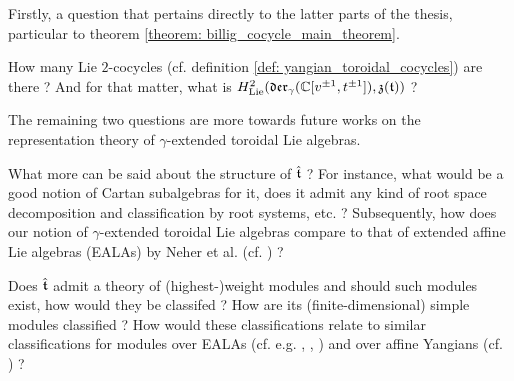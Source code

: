         Firstly, a question that pertains directly to the latter parts of the thesis, particular to theorem \ref{theorem: billig_cocycle_main_theorem}.
        \begin{question}
            How many  Lie $2$-cocycles (cf. definition \ref{def: yangian_toroidal_cocycles}) are there ? And for that matter, what is $H^2_{\mathrm{Lie}}(\mathfrak{der}_{\gamma}(\mathbb{C}[v^{\pm 1}, t^{\pm 1}]), \mathfrak{z}(\mathfrak{t}))$ ?
        \end{question}

        The remaining two questions are more towards future works on the representation theory of $\gamma$-extended toroidal Lie algebras.
        \begin{question}
            What more can be said about the structure of $\hat{\mathfrak{t}}$ ? For instance, what would be a good notion of Cartan subalgebras for it, does it admit any kind of root space decomposition and classification by root systems, etc. ? Subsequently, how does our notion of $\gamma$-extended toroidal Lie algebras compare to that of extended affine Lie algebras (EALAs) by Neher et al. (cf. \cite{neher_lectures_on_EALAs}) ?
        \end{question}
        \begin{question}
            Does $\hat{\mathfrak{t}}$ admit a theory of (highest-)weight modules and should such modules exist, how would they be classifed ? How are its (finite-dimensional) simple modules classified ? How would these classifications relate to similar classifications for modules over EALAs (cf. e.g. \cite{billig_representations_of_toroidal_extended_affine_lie_algebras}, \cite{billig_a_module_category_over_toroidal_EALAs}, \cite{billig_lau_simple_modules_over_EALAs}) and over affine Yangians (cf. \cite{billig_futorny_molev_verma_modules_for_yangians}) ?
        \end{question}